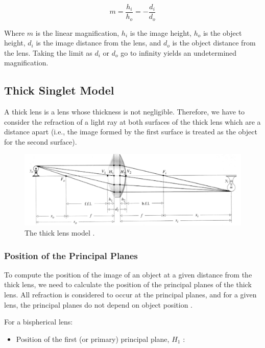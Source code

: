 \begin{equation}
    m = \frac{h_i}{h_o} = - \frac{d_i}{d_o}
\end{equation}

Where $m$ is the linear magnification, $h_i$ is the image height, $h_o$ is the object height, $d_i$ is the image distance from the lens, and $d_o$ is the object distance from the lens. Taking the limit as $d_i$ or $d_o$ go to infinity yields an undetermined magnification.

\subsection{Thick Singlet Model} 
\label{sec:thick-singlet-model}

A thick lens is a lens whose thickness is not negligible. Therefore, we have to consider the refraction of a light ray at both surfaces of the thick lens which are a distance apart (i.e., the image formed by the first surface is treated as the object for the second surface).

\begin{figure}[H]
\centering
\includegraphics[width=1\textwidth]{figures/thick-lens.png}
\caption{The thick lens model \cite{Jones2013}.}
\label{fig:thick-lens-model}
\end{figure}

\subsubsection{Position of the Principal Planes}

To compute the position of the image of an object at a given distance from the thick lens, we need to calculate the position of the principal planes of the thick lens. All refraction is considered to occur at the principal planes, and for a given lens, the principal planes do not depend on object position \cite{Nave2017}.

For a bispherical lens:

\begin{itemize}
    \item Position of the first (or primary) principal plane, $H_1$ \cite{Nave2017}:
\end{itemize}

